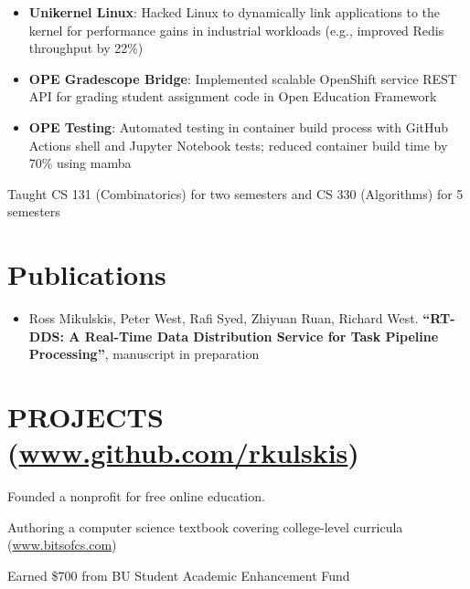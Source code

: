 \documentclass[10pt]{article}
\begin{document}
\begin{FlushLeft}
\begin{itemize}
\item \textbf{Unikernel Linux}: Hacked Linux to dynamically link applications to the kernel for performance gains in industrial workloads (e.g., improved Redis throughput by 22\%)
\item \textbf{OPE Gradescope Bridge}: Implemented scalable OpenShift service REST API for grading student assignment code in Open Education Framework
\item \textbf{OPE Testing}: Automated testing in container build process with GitHub Actions shell and Jupyter Notebook tests; reduced container build time by 70\% using mamba
\end{itemize}

  \begin{itemize}{
    \item Taught CS 131 (Combinatorics) for two semesters and CS 330 (Algorithms) for 5 semesters
    }
  \end{itemize}

  \section{Publications}
  \begin{itemize}
  \item Ross Mikulskis, Peter West, Rafi Syed, Zhiyuan Ruan, Richard West. \textbf{``RT-DDS: A Real-Time Data Distribution Service for Task Pipeline Processing''},
manuscript in preparation    
  \end{itemize}
  \section{PROJECTS (\href{www.github.com/rkulskis}{www.github.com/rkulskis})}
  \begin{itemize}{
    \item Founded a nonprofit for free online education.
    \item Authoring a computer science textbook covering college-level curricula (\href{www.bitsofcs.com}{www.bitsofcs.com})
    \item Earned \$700 from BU Student Academic Enhancement Fund
    }
  \end{itemize}


\end{FlushLeft}
\end{document}
